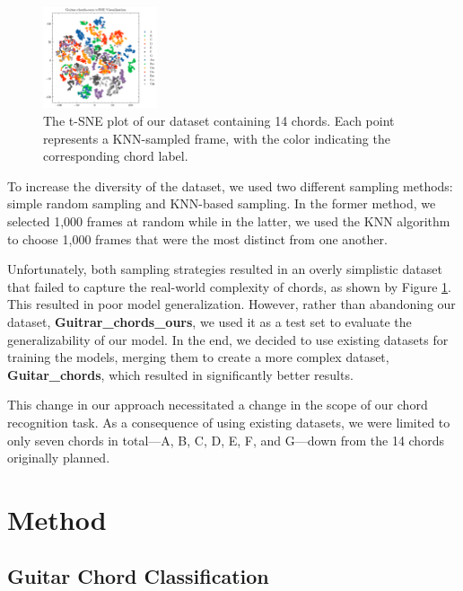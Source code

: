 \documentclass[10pt,twocolumn,letterpaper]{article}
\begin{document}
\begin{figure}[h]
    \centering
    \includegraphics[width=0.3\textwidth]{images/final/Guitar-chords-ours_tsne_plot.png}
    \caption{The t-SNE plot of our dataset containing 14 chords. Each point represents a KNN-sampled frame, with the color indicating the corresponding chord label.}
    \label{fig:ours-tsne-plot}
\end{figure}

To increase the diversity of the dataset, we used two different sampling methods: simple random sampling and KNN-based sampling. In the former method, we selected 1,000 frames at random while in the latter, we used the KNN algorithm to choose 1,000 frames that were the most distinct from one another.

Unfortunately, both sampling strategies resulted in an overly simplistic dataset that failed to capture the real-world complexity of chords, as shown by Figure \ref{fig:ours-tsne-plot}. This resulted in poor model generalization. However, rather than abandoning our dataset, \textbf{Guitrar\_chords\_ours}, we used it as a test set to evaluate the generalizability of our model. In the end, we decided to use existing datasets \cite{guitar-chord-tvon8_dataset,guitar-chord-bounding-box_dataset, guitar-chord-handshape_dataset, guitar-chords-daewp_dataset} for training the models, merging them to create a more complex dataset, \textbf{Guitar\_chords}, which resulted in significantly better results.

This change in our approach necessitated a change in the scope of our chord recognition task. As a consequence of using existing datasets, we were limited to only seven chords in total—A, B, C, D, E, F, and G—down from the 14 chords originally planned.

\section{Method}

\subsection{Guitar Chord Classification}
\end{document}
